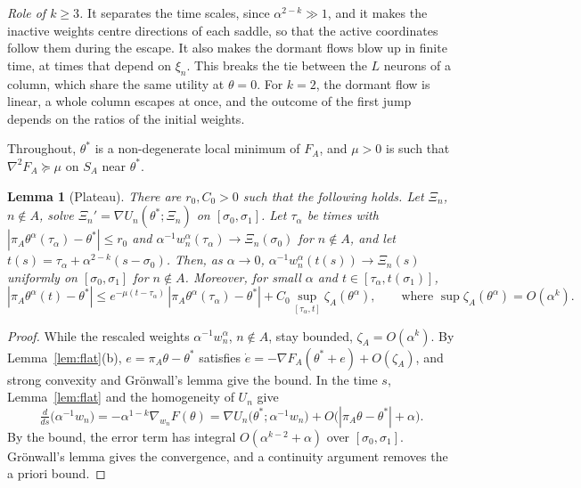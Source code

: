\documentclass[11pt]{article}
\newtheorem{lemma}{Lemma}
\theoremstyle{definition}
\theoremstyle{remark}
\begin{document}
\emph{Role of $k\ge3$.} It separates the time scales, since $\alpha^{2-k}\gg1$, and it makes the inactive weights centre directions of each saddle, so that the active coordinates follow them during the escape. It also makes the dormant flows blow up in finite time, at times that depend on $\xi_n$. This breaks the tie between the $L$ neurons of a column, which share the same utility at $\theta=0$. For $k=2$, the dormant flow is linear, a whole column escapes at once, and the outcome of the first jump depends on the ratios of the initial weights.

Throughout, $\theta^*$ is a non-degenerate local minimum of $F_A$, and $\mu>0$ is such that $\nabla^2F_A\succeq\mu$ on $S_A$ near $\theta^*$.

\begin{lemma}[Plateau]\label{lem:plateau}
There are $r_0,C_0>0$ such that the following holds. Let $\Xi_n$, $n\notin A$, solve $\Xi_n'=\nabla U_n(\theta^*;\Xi_n)$ on $[\sigma_0,\sigma_1]$. Let $\tau_\alpha$ be times with $|\pi_A\theta^\alpha(\tau_\alpha)-\theta^*|\le r_0$ and $\alpha^{-1}w^\alpha_n(\tau_\alpha)\to\Xi_n(\sigma_0)$ for $n\notin A$, and let $t(s)=\tau_\alpha+\alpha^{2-k}(s-\sigma_0)$. Then, as $\alpha\to0$, $\alpha^{-1}w_n^\alpha(t(s))\to\Xi_n(s)$ uniformly on $[\sigma_0,\sigma_1]$ for $n\notin A$. Moreover, for small $\alpha$ and $t\in[\tau_\alpha,t(\sigma_1)]$,
\[
|\pi_A\theta^\alpha(t)-\theta^*|\le e^{-\mu(t-\tau_\alpha)}\,|\pi_A\theta^\alpha(\tau_\alpha)-\theta^*|+C_0\sup_{[\tau_\alpha,t]}\zeta_A(\theta^\alpha),\qquad\text{where }\sup\zeta_A(\theta^\alpha)=O(\alpha^k).
\]
\end{lemma}

\begin{proof}
While the rescaled weights $\alpha^{-1}w^\alpha_n$, $n\notin A$, stay bounded, $\zeta_A=O(\alpha^k)$. By Lemma~\ref{lem:flat}(b), $e=\pi_A\theta-\theta^*$ satisfies $\dot e=-\nabla F_A(\theta^*+e)+O(\zeta_A)$, and strong convexity and Grönwall's lemma give the bound. In the time $s$, Lemma~\ref{lem:flat} and the homogeneity of $U_n$ give
\[
\tfrac{d}{ds}\big(\alpha^{-1}w_n\big)=-\alpha^{1-k}\nabla_{w_n}F(\theta)=\nabla U_n\big(\theta^*;\alpha^{-1}w_n\big)+O\big(|\pi_A\theta-\theta^*|+\alpha\big).
\]
By the bound, the error term has integral $O(\alpha^{k-2}+\alpha)$ over $[\sigma_0,\sigma_1]$. Grönwall's lemma gives the convergence, and a continuity argument removes the a priori bound.
\end{proof}
\end{document}
